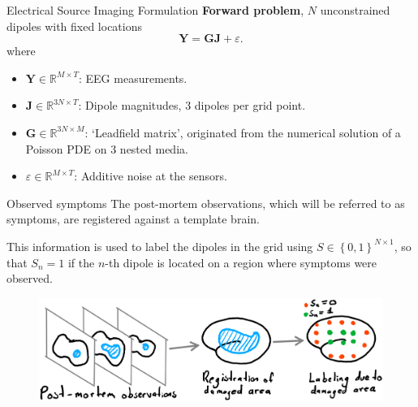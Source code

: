 \documentclass[progressbar=head]{beamer}
\newcommand{\set}[1]{ \left\{ #1 \right\} }
\newcommand{\ppar}[1]{ \left( #1 \right) }
\newcommand{\J}{\mathbf{J}}
\newcommand{\Y}{\mathbf{Y}}
\newcommand{\G}{\mathbf{G}}
\newcommand{\U}{\mathbf{U}}
\newcommand{\R}{\mathbb{R}}
\begin{document}
\begin{frame}{Electrical Source Imaging Formulation}
\textbf{Forward problem}, $N$ unconstrained dipoles with fixed locations
\begin{equation}
\Y = \G \J + \varepsilon.
\end{equation}
where
\begin{itemize}
\item $\Y \in \R^{M \times T}$: EEG measurements.
\item $\J \in \R^{3N \times T}$: Dipole magnitudes, 3 dipoles per grid point.
\item $\G \in \R^{3N\times M}$: `Leadfield matrix', originated from the numerical solution of a Poisson PDE on 3 nested media.
\item $\varepsilon\in \R^{M\times T}$: Additive noise at the sensors.
\end{itemize}
\end{frame}

%

\begin{frame}{Observed symptoms}
The post-mortem observations, which will be referred to as \alert{symptoms}, are registered against a template brain. 

This information is used to label the dipoles in the grid using
${S\in \set{0,1}^{N\times 1}}$, so that $S_n = 1$ if the $n$-th dipole is located on a region where symptoms were observed.

\begin{figure}
\centering
\includegraphics[width=0.8\linewidth]{./img_oldbeamer/sketch02_v2}
\end{figure}

\end{frame}
\end{document}
